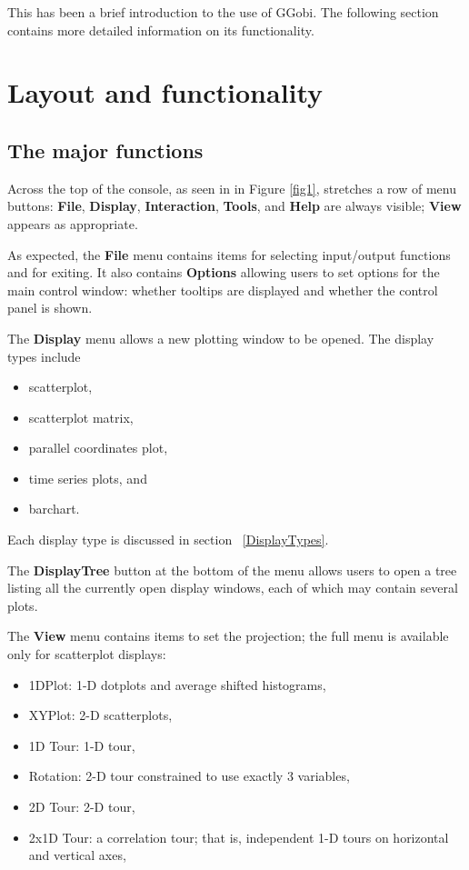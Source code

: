 \documentclass[11pt]{article}
\def\Widget#1{\textbf{#1}}
\begin{document}
This has been a brief introduction to the use of GGobi. The following
section contains more detailed information on its functionality.

\section{Layout and functionality}

\subsection{The major functions}

Across the top of the console, as seen in in Figure \ref{fig1},
stretches a row of menu buttons: \Widget{File}, \Widget{Display},
\Widget{Interaction}, \Widget{Tools}, and \Widget{Help} are always visible;
\Widget{View} appears as appropriate.

As expected, the \Widget{File} menu contains items for selecting
input/output functions and for exiting.  It also contains
\Widget{Options} allowing users to set options for the main control
window: whether tooltips are displayed and whether the control panel
is shown.

The \Widget{Display} menu allows a new plotting window to be opened. 
The display types include
\begin{itemize}
\itemsep 0em
\item scatterplot,
\item scatterplot matrix, 
\item parallel coordinates plot, 
\item time series plots, and
\item barchart.
\end{itemize}

Each display type
is discussed in section ~\ref{DisplayTypes}.

The \Widget{DisplayTree} button at the bottom of the menu allows users to
open a tree listing all the currently open display windows, each of
which may contain several plots.

The \Widget{View} menu contains items to set the projection; the
full menu is available only for scatterplot displays:
\begin{itemize}
\itemsep 0em
\item 1DPlot: 1-D dotplots and average shifted histograms,
\item XYPlot: 2-D scatterplots,
\item 1D Tour: 1-D tour,
\item Rotation: 2-D tour constrained to use exactly 3 variables,
\item 2D Tour: 2-D tour,
\item 2x1D Tour: a correlation tour; that is, independent 1-D tours on
      horizontal and vertical axes,
\end{itemize}
\end{document}
